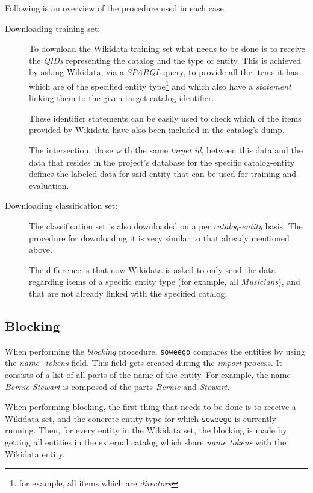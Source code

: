 \documentclass[epsfig,a4paper,11pt,titlepage,twoside,openany]{book}
\newcommand{\soweego}[0]{\texttt{soweego}\xspace}
\begin{document}
Following is an overview of the procedure used in each case. 

\begin{description}
\item[Downloading training set:] 

To download the Wikidata training set what needs to be done is to receive the \textit{QIDs} representing the catalog and the type of entity. This is achieved by asking Wikidata, via a \textit{SPARQL} query, to provide all the items it has which are of the specified entity type\footnote{for example, all items which are \textit{directors}} and which also have a \textit{statement} linking them to the given target catalog identifier. 

These identifier statements can be easily used to check which of the items provided by Wikidata have also been included in the catalog's dump. 

The intersection, those with the same \textit{target id}, between this data and the data that resides in the project’s database for the specific catalog-entity defines the labeled data  for said entity that can be used for training and evaluation.
 
 
\item[Downloading classification set:] The classification set is also downloaded on a per \textit{catalog-entity} basis. The procedure for downloading it is very similar to that already mentioned above. 

The difference is that now Wikidata is asked to only send  the data regarding items of a specific entity type (for example, all \textit{Musicians}), and that are not already linked with the specified catalog.
\end{description}



\subsection{Blocking}
\label{sec:soweego-st-blocking}

When performing the \textit{blocking} procedure, \soweego compares the entities by using the \textit{name\_tokens} field. This field gets created during the \textit{import} process. It consists of a list of all parts of the name of the entity. For example, the name \textit{Bernie Stewart} is composed of the parts \textit{Bernie} and \textit{Stewart}.

When performing blocking, the first thing that needs to be done is to receive a Wikidata set, and the concrete entity type for which \texttt{soweego} is currently running. Then, for every entity in the Wikidata set, the blocking is made by getting all entities in the external catalog which share \textit{name tokens} with the Wikidata entity. 
\end{document}
